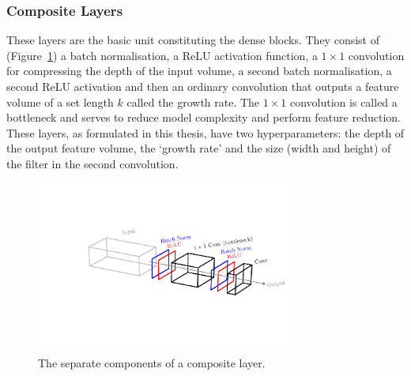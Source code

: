 \subsubsection{Composite Layers}
These layers are the basic unit constituting the dense blocks. They consist of (Figure~\ref{fig:machine_learning:composite_layer}) a batch normalisation, a ReLU activation function, a $1\times{}1$ convolution for compressing the depth of the input volume, a second batch normalisation, a second ReLU activation and then an ordinary convolution that outputs a feature volume of a set length $k$ called the growth rate. The $1\times{}1$ convolution is called a bottleneck and serves to reduce model complexity and perform feature reduction. These layers, as formulated in this thesis, have two hyperparameters: the depth of the output feature volume, the `growth rate' and the size (width and height) of the filter in the second convolution. 
\begin{figure}[h!]
    \centering
    \includegraphics[width=0.75\textwidth]{figures/machine_learning/composite_layer.pdf}
    \caption{The separate components of a composite layer.}
        \label{fig:machine_learning:composite_layer}
\end{figure}


